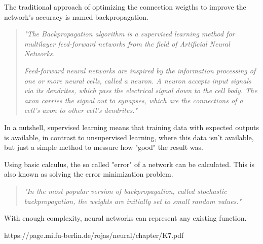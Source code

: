 The traditional approach of optimizing the connection weigths to improve the network's accuracy is named backpropagation.

\begin{quote}
\emph{"The Backpropagation algorithm is a supervised learning method for multilayer feed-forward networks from the field of Artificial Neural Networks. }

\emph{Feed-forward neural networks are inspired by the information processing of one or more neural cells, called a neuron. A neuron accepts input signals via its dendrites, which pass the electrical signal down to the cell body. The axon carries the signal out to synapses, which are the connections of a cell’s axon to other cell’s dendrites."} \cite{backprop_from_scratch} 
\end{quote}
	
In a nutshell, supervised learning means that training data with expected outputs is available, in contrast to unsupervised learning, where this data isn't available, but just a simple method to messure how "good" the result was. \cite{Learning2014}

Using basic calculus, the so called "error" of a network can be calculated. This is also known as solving the error minimization problem. \cite{Sathyanarayana2014}

\begin{quote}
\emph{"In the most popular version of backpropagation, called stochastic backpropagation, the weights are initially set to small random values."}\cite{Sathyanarayana2014}	
\end{quote}

With enough complexity, neural networks can represent any existing function. \cite{http://neuralnetworksanddeeplearning.com/chap4.html}


https://page.mi.fu-berlin.de/rojas/neural/chapter/K7.pdf